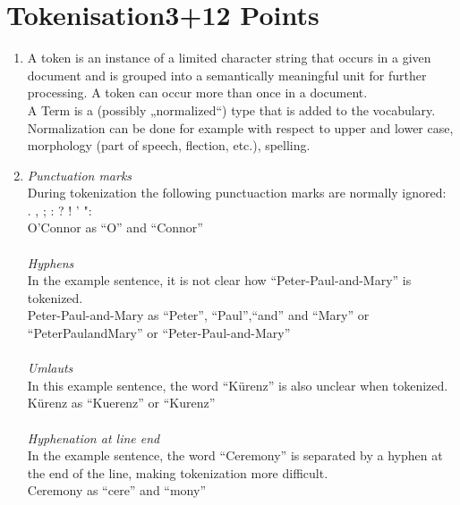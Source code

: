 \documentclass[10pt,a4paper]{article}
\begin{document}
\section{\hfill Tokenisation\hfill 3+12 Points}
\begin{enumerate}
    \item  A token is an instance of a limited character string that occurs in a given document and is grouped into a semantically meaningful unit for further processing.
    A token can occur more than once in a document. \\
    
    A Term is a (possibly „normalized“) type that is added to the vocabulary. Normalization can be done for example with respect to upper and lower case, morphology (part of speech, flection, etc.), spelling. \\
    
    \item  \textit{Punctuation marks} \\
                 During tokenization the following punctuaction marks are normally ignored: \\
                . , ; : ? ! ' ": \\
                O'Connor as \enquote{O} and \enquote{Connor} \\
                \\
           \textit{Hyphens} \\
                In the example sentence, it is not clear how \enquote{Peter-Paul-and-Mary} is tokenized. \\
                Peter-Paul-and-Mary as \enquote{Peter}, \enquote{Paul},\enquote{and} and \enquote{Mary} or \enquote{PeterPaulandMary} or \enquote{Peter-Paul-and-Mary} \\
                \\
           \textit{Umlauts}\\
                In this example sentence, the word \enquote{Kürenz} is also unclear when tokenized. \\
                Kürenz as \enquote{Kuerenz} or \enquote{Kurenz}\\
                \\
          \textit{Hyphenation at line end} \\
                In the example sentence, the word \enquote{Ceremony} is separated by a hyphen at the end of the line, making tokenization more difficult. \\
                Ceremony as \enquote{cere} and \enquote{mony} \\
\end{enumerate}  
\end{document}
